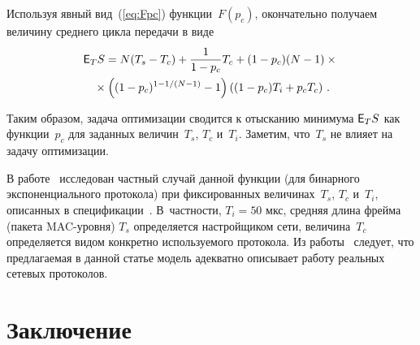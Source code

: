 \begin{multicols}{2}
Используя явный вид~(\ref{eq:Fpc}) функции~$F(p_c)$, окончательно
получаем  величину среднего цикла передачи в  виде
\begin{multline*}
{\sf E}_T S   = N(T_{s}-T_{c}) +\displaystyle\frac{\displaystyle 1\mathstrut}{\displaystyle 1-p_c\mathstrut}T_{c} +   (1-p_c)(N-1)\times{}\\
{}\times
\left((1-p_c)^{1-1/(N-1)}-1\right)\left((1-p_c)T_{i} + p_c
   T_{c}\right)\,.\!
\end{multline*}

Таким образом, задача оптимизации сводится к  отысканию минимума
${\sf E}_T S$ как функции~$p_c$ для заданных величин~$T_{s}$, $T_{c}$ и~$T_{i}$. 
Заметим, что~$T_{s}$ не влияет на задачу оптимизации.

 В работе~\cite{BIANCHI} исследован  частный случай данной функции (для
бинарного экспоненциального протокола) при фиксированных величинах~$T_{s}$, $T_{c}$ и~$T_{i}$, 
описанных в спецификации~\cite{IEEE80211}. В~частности, $T_{i}=50$ мкс,
 средняя длина   фрейма (пакета MAC-уровня) $T_{s}$ определяется
настройщиком сети,  величина~$T_{c}$ определяется
 видом конкретно используемого протокола.
Из работы~\cite{BIANCHI} следует, что предлагаемая в данной статье
модель адекватно описывает работу реальных сетевых протоколов.

\section{Заключение}


\end{multicols}
